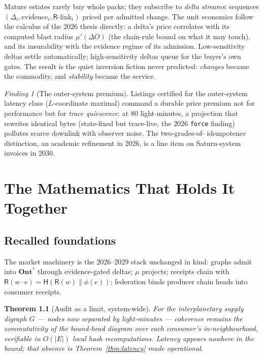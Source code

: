 \documentclass[11pt,a4paper]{report}
\newtheorem{theorem}{Theorem}[chapter]
\theoremstyle{definition}
\theoremstyle{remark}
\newtheorem{finding}[theorem]{Finding}
\newcommand{\Ont}{\mathbf{Ont}}
\newcommand{\Hash}{\mathsf{H}}
\newcommand{\rec}{\mathsf{R}}
\newcommand{\mymu}{\mu}
\newcommand{\del}{\Delta}
\begin{document}
Mature estates rarely buy whole packs; they subscribe to \emph{delta
streams}: sequences $(\del_i, \text{evidence}_i, \rec\text{-link}_i)$
priced per admitted change. The unit economics follow the calculus of the
2026 thesis directly: a delta's price correlates with its computed blast
radius $\mymu'(\del O)$ (the chain-rule bound on what it may touch), and
its insurability with the evidence regime of its admission. Low-sensitivity
deltas settle automatically; high-sensitivity deltas queue for the buyer's
own gates. The result is the quiet inversion fiction never predicted:
\emph{changes} became the commodity, and \emph{stability} became the
service.

\begin{finding}[The outer-system premium]
Listings certified for the outer-system latency class ($L$-coordinate
maximal) command a durable price premium not for performance but for
\emph{trace quiescence}: at $80$ light-minutes, a projection that rewrites
identical bytes (state-fixed but trace-live, the 2026 \texttt{force}
finding) pollutes scarce downlink with observer noise. The two-grades-of-%
idempotence distinction, an academic refinement in 2026, is a line item on
Saturn-system invoices in 2030.
\end{finding}

\chapter{The Mathematics That Holds It Together}

\section{Recalled foundations}

The market machinery is the 2026--2029 stack unchanged in kind: graphs
admit into $\Ont^{*}$ through evidence-gated deltas; $\mymu$ projects;
receipts chain with $\rec(w \cdot e) = \Hash(\rec(w) \| \phi(e))$;
federation binds producer chain heads into consumer receipts.

\begin{theorem}[Audit as a limit, system-wide]\label{thm:limit-recall}
For the interplanetary supply digraph $G$ --- nodes now separated by
light-minutes --- coherence remains the commutativity of the bound-head
diagram over each consumer's in-neighbourhood, verifiable in $O(|E|)$
local hash recomputations. Latency appears nowhere in the bound; that
absence is Theorem~\ref{thm:latency} made operational.
\end{theorem}
\end{document}

